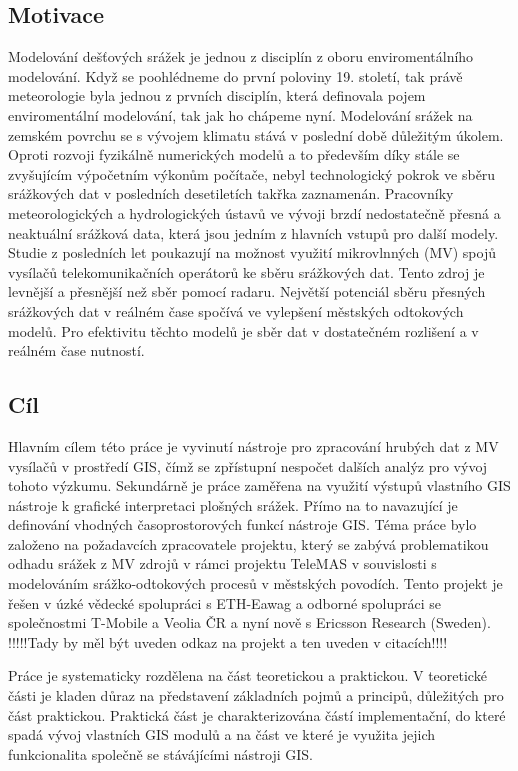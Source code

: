 \documentclass[a4paper,12pt]{report}
\begin{document}
\subsection*{Motivace}
Modelování dešťových srážek je jednou z disciplín z oboru enviromentálního modelování. Když se poohlédneme do první poloviny 19. století, tak právě meteorologie byla jednou z prvních disciplín, která definovala pojem enviromentální modelování, tak jak ho chápeme nyní. Modelování srážek na zemském povrchu se s vývojem klimatu stává v poslední době důležitým úkolem. Oproti rozvoji fyzikálně numerických modelů a to především díky stále se zvyšujícím výpočetním výkonům počítače, nebyl technologický pokrok ve sběru srážkových dat v posledních desetiletích takřka zaznamenán. Pracovníky meteorologických a hydrologických ústavů ve vývoji brzdí nedostatečně přesná a neaktuální srážková data, která jsou jedním z hlavních vstupů pro další modely. Studie z posledních let poukazují na možnost využití mikrovlnných (MV) spojů vysílačů telekomunikačních operátorů ke sběru srážkových dat. Tento zdroj je levnější a přesnější než sběr pomocí radaru.\cite{radar_meterology} Největší potenciál sběru přesných srážkových dat v reálném čase spočívá ve vylepšení městských odtokových modelů. Pro efektivitu těchto modelů je sběr dat v dostatečném rozlišení a v reálném čase nutností.
\subsection*{Cíl}
Hlavním cílem této práce je vyvinutí nástroje pro zpracování hrubých dat z MV vysílačů v prostředí GIS, čímž se zpřístupní nespočet dalších analýz pro vývoj tohoto výzkumu. Sekundárně je práce zaměřena na využití výstupů vlastního GIS nástroje k grafické interpretaci plošných srážek. Přímo na to navazující je definování vhodných časoprostorových funkcí nástroje GIS. Téma práce bylo založeno na požadavcích zpracovatele projektu, který se zabývá problematikou odhadu srážek z MV zdrojů v rámci projektu TeleMAS v souvislosti s modelováním srážko-odtokových procesů v městských povodích. Tento projekt je řešen v úzké vědecké spolupráci s ETH-Eawag a odborné spolupráci se společnostmi T-Mobile a Veolia ČR a nyní nově s Ericsson Research (Sweden).  !!!!!Tady by měl být uveden odkaz na projekt a ten uveden v citacích!!!! 

Práce je systematicky rozdělena na část teoretickou a praktickou. V teoretické části je kladen důraz na představení základních pojmů a principů, důležitých pro část praktickou. Praktická část je charakterizována částí implementační, do které spadá vývoj vlastních GIS modulů a na část ve které je využita jejich funkcionalita společně se stávájícími nástroji GIS.
\end{document}
